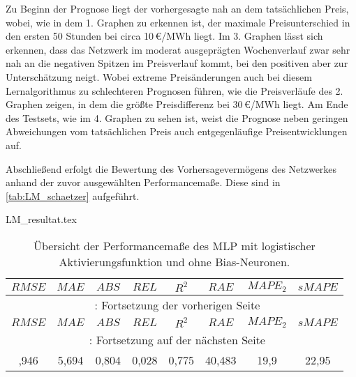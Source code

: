 Zu Beginn der Prognose liegt der vorhergesagte nah an dem tatsächlichen Preis, wobei, wie in dem 1. Graphen zu erkennen ist, der maximale Preisunterschied in den ersten 50 Stunden bei circa 10\,€/MWh liegt. Im 3. Graphen lässt sich erkennen, dass das Netzwerk im moderat ausgeprägten Wochenverlauf zwar sehr nah an die negativen Spitzen im Preisverlauf kommt, bei den positiven aber zur Unterschätzung neigt. Wobei extreme Preisänderungen auch bei diesem Lernalgorithmus zu schlechteren Prognosen führen, wie die Preisverläufe des 2. Graphen zeigen, in dem die größte Preisdifferenz bei 30\,€/MWh liegt. Am Ende des Testsets, wie im 4. Graphen zu sehen ist, weist die Prognose neben geringen Abweichungen vom tatsächlichen Preis auch entgegenläufige Preisentwicklungen auf. 

Abschließend erfolgt die Bewertung des Vorhersagevermögens des Netzwerkes anhand der zuvor ausgewählten Performancemaße. Diese sind in \autoref{tab:LM_schaetzer} aufgeführt.

\begin{filecontents*}{LM_resultat.tex}
{
\captionsetup{skip=1pt,margin=5pt,position=below} %

\begin{longtable}{cccccccc}
    \caption[Übersicht der Performancemaße des genauesten Netzwerkes beim LM-Alg.]{Übersicht der Performancemaße des MLP mit logistischer Aktivierungsfunktion und ohne Bias-Neuronen.} \label{tab:LM_schaetzer}\\
    \toprule
    \hiderowcolors
        $RMSE$ & $MAE$ & $ABS$ & $REL$ & $R^2$ & $RAE$ & $MAPE_2$ & $sMAPE$ \\
    \midrule
    \endfirsthead
        \multicolumn{8}{c}{\footnotesize \tablename\ \thetable{}: Fortsetzung der vorherigen Seite} \\
    \toprule
        $RMSE$ & $MAE$ & $ABS$ & $REL$ & $R^2$ & $RAE$ & $MAPE_2$ & $sMAPE$ \\
    \midrule
    \endhead
    \midrule
        \multicolumn{8}{c}{{\footnotesize \tablename\ \thetable{}: Fortsetzung auf der nächsten Seite}} \\
    \bottomrule
    \endfoot
    \bottomrule
    \endlastfoot
    \showrowcolors
        7,946 & 5,694 & 0,804 & 0,028 & 0,775 & 40,483 & 19,9 & 22,95 \\
\end{longtable}

}
\end{filecontents*}

